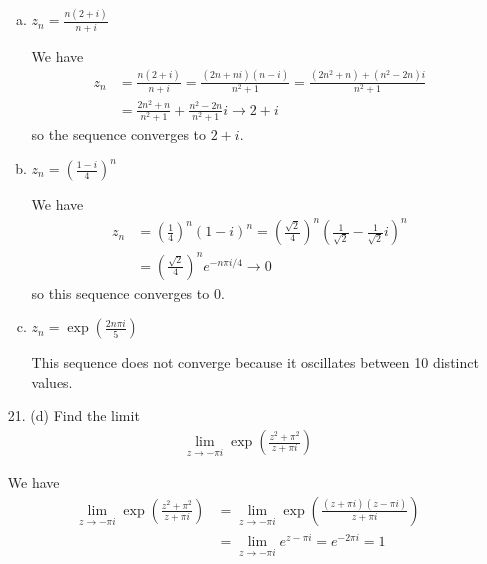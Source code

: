 \documentclass{article}
\begin{document}
\begin{itemize}
\begin{enumerate}[(a)]
			\item $z_n=\frac{n(2+i)}{n+i}$
				\begin{soln}
					We have
					\begin{align*}
						z_n &= \frac{n(2+i)}{n+i} = \frac{(2n+ni)(n-i)}{n^2+1} = \frac{(2n^2+n) + (n^2-2n)i}{n^2+1} \\
						&= \frac{2n^2+n}{n^2+1} + \frac{n^2-2n}{n^2+1}i \to 2 + i
					\end{align*}
					so the sequence converges to $2+i.$
				\end{soln}

			\item $z_n=\left( \frac{1-i}{4} \right)^n$
				\begin{soln}
					We have
					\begin{align*}
						z_n &= \left( \frac{1}{4} \right)^n (1-i)^n = \left( \frac{\sqrt{2}}{4} \right)^n \left( \frac{1}{\sqrt{2}} - \frac{1}{\sqrt{2}}i \right)^n \\
						&= \left( \frac{\sqrt{2}}{4} \right)^n e^{-n\pi i/4} \to 0
					\end{align*}
					so this sequence converges to 0.
				\end{soln}
				
			\item $z_n=\exp\left( \frac{2n\pi i}{5} \right)$
				\begin{soln}
					This sequence does not converge because it oscillates between 10 distinct values.
				\end{soln}
				
		\end{enumerate}

	\item[21.] (d) Find the limit
		\begin{align*}
			\lim_{z\to-\pi i} \exp\left( \frac{z^2+\pi^2}{z+\pi i} \right)
		\end{align*}
		\begin{soln}
			We have
			\begin{align*}
				\lim_{z\to-\pi i} \exp\left( \frac{z^2+\pi^2}{z+\pi i} \right) &= \lim_{z\to-\pi i} \exp\left( \frac{(z+\pi i)(z-\pi i)}{z + \pi i} \right) \\
				&= \lim_{z\to-\pi i} e^{z-\pi i} = e^{-2\pi i} = 1
			\end{align*}
		\end{soln}
		
\end{itemize}
\end{document}
